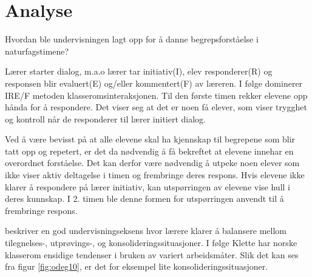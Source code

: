 \documentclass[main.tex]{subfiles}
\begin{document}
\section*{Analyse}
\label{sec:2}
Hvordan ble undervisningen lagt opp for å danne begrepsforståelse i naturfagstimene?

Lærer starter dialog, m.a.o lærer tar initiativ(I), elev responderer(R) og responsen blir
evaluert(E) og/eller kommentert(F) av læreren. I følge  dominerer IRE/F 
metoden klasseromsinteraksjonen. Til den første timen rekker elevene opp hånda for å 
respondere. Det viser seg at det er noen få elever, som viser trygghet og kontroll når 
de responderer til lærer initiert dialog. 

Ved å være bevisst på at alle elevene skal ha kjennskap til 
begrepene som blir tatt opp og repetert, er det da nødvendig å få bekreftet at elevene innehar en 
overordnet forståelse. Det kan derfor være nødvendig å utpeke noen elever som ikke viser aktiv 
deltagelse i timen og frembringe deres respons. Hvis elevene ikke klarer å respondere på lærer 
initiativ, kan utspørringen av elevene vise hull i deres kunnskap. I 2. timen ble denne formen for
utspørringen anvendt til å frembringe respons. 



 beskriver en god undervisningseksens hvor lærere klarer å balansere mellom tilegnelses-,
utprøvings-, og konsolideringssituasjoner. I følge Klette har norske klasserom ensidige tendenser i bruken av 
variert arbeidsmåter. Slik det kan ses fra figur \ref{fig:odeg10}, er det for eksempel lite konsolideringssituasjoner.
\end{document}

